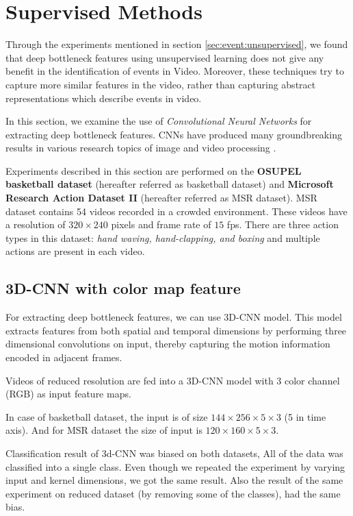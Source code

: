 \section{Supervised Methods}
\label{sec:event:supervised}
Through the experiments mentioned in section  \ref{sec:event:unsupervised}, we found that deep bottleneck features using unsupervised learning does not give any benefit in the identification of events in Video.  Moreover, these techniques try to capture more similar features in the video, rather than capturing abstract representations which describe events in video.

In this section, we examine the use of \textit{Convolutional Neural Networks} for extracting deep bottleneck features.  CNNs have produced many groundbreaking results in various research topics of image and video processing \citep{KarpathyCVPR14, ji20133d, krizhevsky2012imagenet}.

Experiments described in this section are performed on the \textbf{OSUPEL basketball dataset} \cite{brendel2011probabilistic} (hereafter referred as basketball dataset) and \textbf{Microsoft Research Action Dataset \RN{2}} (hereafter referred as MSR dataset).  MSR dataset contains 54 videos recorded in a crowded environment.  These videos have a resolution of $320 \times 240$ pixels and frame rate of $15$ fps.  There are three action types in this dataset: \textit{hand waving, hand-clapping, and boxing } and multiple actions are present in each video.

\subsection{3D-CNN with color map feature}
For extracting deep bottleneck features, we can use 3D-CNN model.  This model extracts features from both spatial and temporal dimensions by performing three dimensional convolutions on input, thereby capturing the motion information encoded in adjacent frames\citep{ji20133d}.

Videos of reduced resolution are fed into a 3D-CNN model with 3 color channel (RGB) as input feature maps.

In case of basketball dataset, the input is of size $144 \times 256 \times 5 \times 3$ (5 in time axis).  And for MSR dataset the size of input is $120 \times 160 \times 5 \times 3$.

Classification result of 3d-CNN was biased on both datasets, All of the data was classified into a single class.  Even though we repeated the experiment by varying input and kernel dimensions, we got the same result.  Also the result of the same experiment on reduced dataset (by removing some of the classes), had the same bias.

